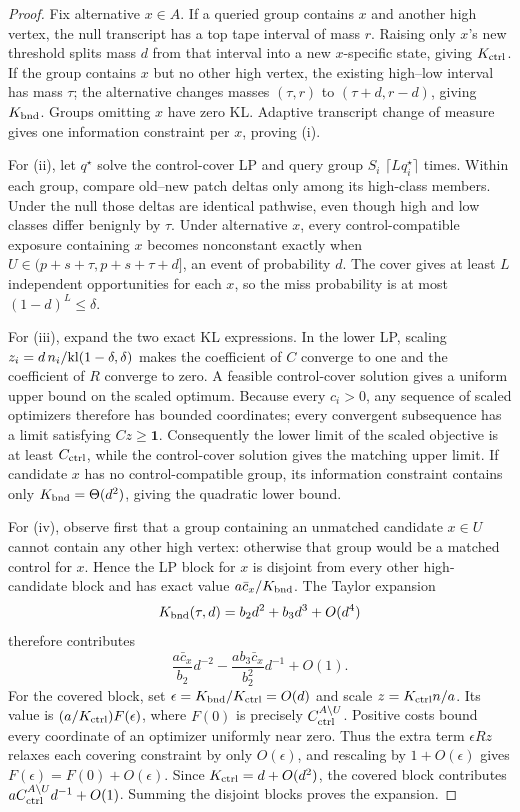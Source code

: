 \begin{proof}
Fix alternative \(x\in A\).  If a queried group contains \(x\) and another
high vertex, the null transcript has a top tape interval of mass \(r\).  Raising
only \(x\)'s new threshold splits mass \(d\) from that interval into a new
\(x\)-specific state, giving \(K_{\rm ctrl}\).  If the group contains \(x\)
but no other high vertex, the existing high--low interval has mass \(\tau\);
the alternative changes masses \((\tau,r)\) to \((\tau+d,r-d)\), giving
\(K_{\rm bnd}\).  Groups omitting \(x\) have zero KL.  Adaptive transcript
change of measure gives one information constraint per \(x\), proving (i).

For (ii), let \(q^\star\) solve the control-cover LP and query group \(S_i\)
\(\lceil Lq_i^\star\rceil\) times.  Within each group, compare old--new patch
deltas only among its high-class members.  Under the null those deltas are
identical pathwise, even though high and low classes differ benignly by
\(\tau\).  Under alternative \(x\), every control-compatible exposure containing
\(x\) becomes nonconstant exactly when
\(U\in(p+s+\tau,p+s+\tau+d]\), an event of probability \(d\).
The cover gives at least \(L\) independent opportunities for each \(x\), so the
miss probability is at most \((1-d)^L\le\delta\).

For (iii), expand the two exact KL expressions.  In the lower LP, scaling
\(z_i=d\,n_i/\mathrm{kl}(1-\delta,\delta)\) makes the coefficient of \(C\) converge to
one and the coefficient of \(R\) converge to zero.  A feasible control-cover
solution gives a uniform upper bound on the scaled optimum.  Because every
\(c_i>0\), any sequence of scaled optimizers therefore has bounded
coordinates; every convergent subsequence has a limit satisfying
\(Cz\ge\mathbf 1\).  Consequently the lower limit of the scaled objective is
at least \(C_{\rm ctrl}\), while the control-cover solution gives the matching
upper limit.  If candidate \(x\) has no control-compatible group, its
information constraint contains only \(K_{\rm bnd}=\Theta(d^2)\), giving the
quadratic lower bound.

For (iv), observe first that a group containing an unmatched candidate
\(x\in U\) cannot contain any other high vertex: otherwise that group would be
a matched control for \(x\).  Hence the LP block for \(x\) is disjoint from
every other high-candidate block and has exact value
\(a\bar c_x/K_{\rm bnd}\).  The Taylor expansion
\[
K_{\rm bnd}(\tau,d)=b_2d^2+b_3d^3+O(d^4)
\]
therefore contributes
\[
\frac{a\bar c_x}{b_2}d^{-2}
-\frac{ab_3\bar c_x}{b_2^2}d^{-1}+O(1).
\]
For the covered block, set
\(\epsilon=K_{\rm bnd}/K_{\rm ctrl}=O(d)\) and scale
\(z=K_{\rm ctrl}n/a\).  Its value is
\((a/K_{\rm ctrl})F(\epsilon)\), where \(F(0)\) is precisely
\(C_{\rm ctrl}^{A\setminus U}\).  Positive costs bound every coordinate of
an optimizer uniformly near zero.  Thus the extra term
\(\epsilon Rz\) relaxes each covering constraint by only \(O(\epsilon)\),
and rescaling by \(1+O(\epsilon)\) gives
\(F(\epsilon)=F(0)+O(\epsilon)\).  Since
\(K_{\rm ctrl}=d+O(d^2)\), the covered block contributes
\(aC_{\rm ctrl}^{A\setminus U}d^{-1}+O(1)\).  Summing the disjoint blocks
proves the expansion.


\end{proof}
